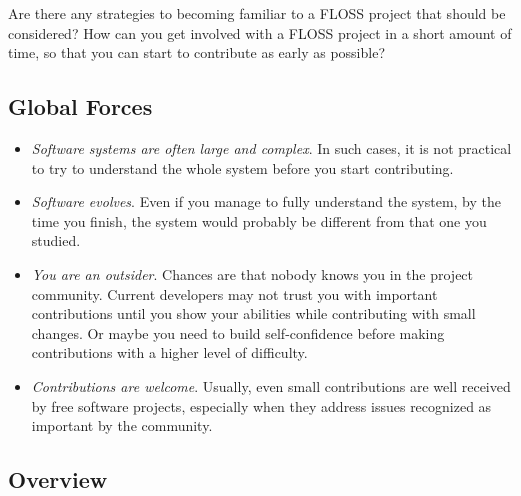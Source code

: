 \documentclass[12pt]{article}
\begin{document}
Are there any strategies to becoming familiar to 
a FLOSS project that should be considered?
How can you get involved with a FLOSS project in a short amount of time, 
so that you can start to contribute as early as possible?

\subsection{Global Forces}
\begin{itemize}
\item \emph{Software systems are often large and complex}. In such cases, it is
not practical to try to understand the whole system before you start contributing.

\item \emph{Software evolves}. Even if you manage to fully  understand the 
system, by the time you finish, the system would probably be different from 
that one you studied. 

\item \emph{You are an outsider}. Chances are that nobody knows you in the
project community. Current developers may not trust you with 
important contributions until you show your abilities while contributing with small changes. 
Or maybe you need to build self-confidence before making contributions with a higher
level of difficulty.

\item \emph{Contributions are welcome}. Usually, even small contributions are
well received by free software projects, especially when they address issues
recognized as important by the community.

\end{itemize}

\subsection{Overview}
\end{document}

